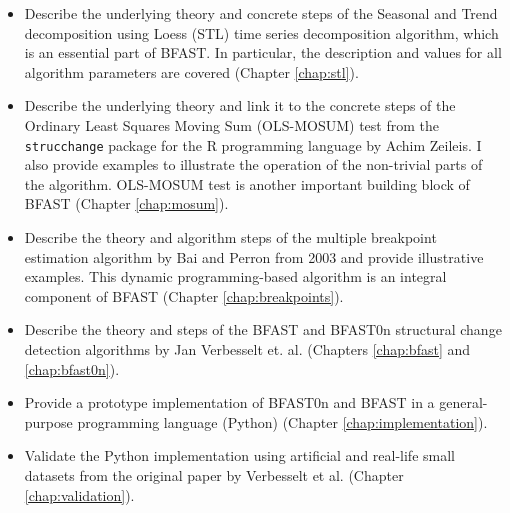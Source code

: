 \documentclass[main.tex]{subfiles}
\begin{document}
\begin{itemize}
\item Describe the underlying theory and concrete steps of the
  Seasonal and Trend decomposition using Loess (STL)
  time series decomposition algorithm, which is an essential part of BFAST.
  In particular, the description and values for all algorithm parameters are
  covered (Chapter \ref{chap:stl}).
\item Describe the underlying theory and link it to the concrete steps of
  the Ordinary Least Squares Moving Sum (OLS-MOSUM) test from the
  \texttt{strucchange} package \cite{strucchange} for the R programming
  language by Achim Zeileis. I also provide examples to illustrate the
  operation of the non-trivial parts of the algorithm. OLS-MOSUM test is another
  important building block of BFAST (Chapter \ref{chap:mosum}).
\item Describe the theory and algorithm steps of the multiple breakpoint estimation
  algorithm by Bai and Perron from 2003 \cite{bai_perron} and provide
  illustrative examples. This dynamic programming-based
  algorithm is an integral component of BFAST (Chapter \ref{chap:breakpoints}).
\item Describe the theory and steps of the BFAST and BFAST0n structural change
  detection algorithms by Jan Verbesselt et. al. \cite{bfast} (Chapters
  \ref{chap:bfast} and \ref{chap:bfast0n}).
\item Provide a prototype implementation of BFAST0n and BFAST in a
  general-purpose programming language (Python) (Chapter \ref{chap:implementation}).
\item Validate the Python implementation using artificial and real-life small
  datasets from the original paper by Verbesselt et al. \cite{bfast} (Chapter \ref{chap:validation}).
\end{itemize}

\biblio
\end{document}
